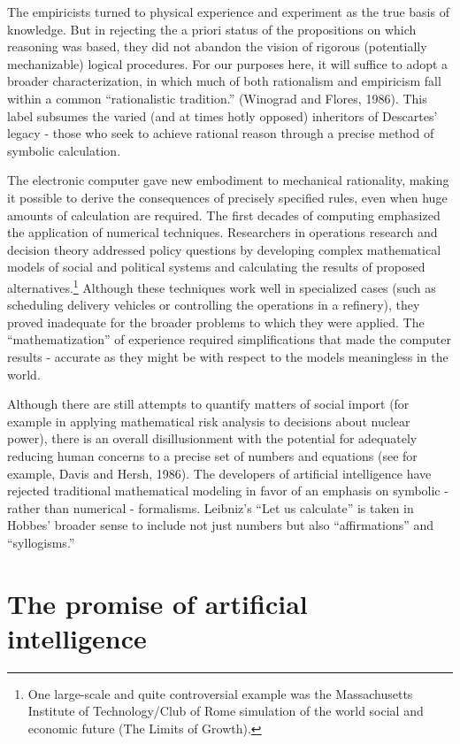 \documentclass[12pt]{article}
\begin{document}
The empiricists turned to physical experience and experiment as the true basis of knowledge. But in rejecting the a priori status of the propositions on which reasoning was based, they did not abandon the vision of rigorous (potentially mechanizable) logical procedures. For our purposes here, it will suffice to adopt a broader characterization, in which much of both rationalism and empiricism fall within a common ``rationalistic tradition.'' (Winograd and Flores, 1986). This label subsumes the varied (and at times hotly opposed) inheritors of Descartes’ legacy - those who seek to achieve rational reason through a precise method of symbolic calculation.

The electronic computer gave new embodiment to mechanical rationality, making it possible to derive the consequences of precisely specified rules, even when huge amounts of calculation are required. The first decades of computing emphasized the application of numerical techniques. Researchers in operations research and decision theory addressed policy questions by developing complex mathematical models of social and political systems and calculating the results of proposed alternatives.\footnote{One large-scale and quite controversial example was the Massachusetts Institute of Technology/Club of Rome simulation of the world social and economic future
(The Limits of Growth).}
Although these techniques work well in specialized cases (such as scheduling delivery vehicles or controlling the operations in a refinery), they proved inadequate for the broader problems to which they were applied. The ``mathematization'' of experience required simplifications that made the computer results - accurate as they might be with respect to the models meaningless in the world.

Although there are still attempts to quantify matters of social import (for example in applying mathematical risk analysis to decisions about nuclear power), there is an overall disillusionment with the potential for adequately reducing human concerns to a precise set of numbers and equations (see for example, Davis and Hersh, 1986). The developers of artificial intelligence have rejected traditional mathematical modeling in favor of an emphasis on symbolic - rather than numerical - formalisms. Leibniz’s ``Let us calculate'' is taken in Hobbes’ broader sense to include not just numbers but also ``affirmations'' and ``syllogisms.''

\section{The promise of artificial intelligence}
\end{document}
